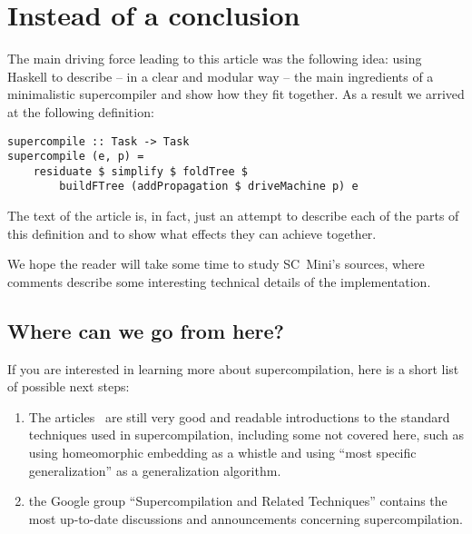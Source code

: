 \section{Instead of a conclusion}

The main driving force leading to this article was the following idea: 
using Haskell to describe -- in a clear and modular way --
the main ingredients of a minimalistic supercompiler and show how they fit together.
As a result we arrived at the following definition:
\begin{lstlisting}
supercompile :: Task -> Task
supercompile (e, p) =
	residuate $ simplify $ foldTree $
		buildFTree (addPropagation $ driveMachine p) e
\end{lstlisting}
The text of the article is, in fact, just an attempt to describe each
of the parts of this definition and to show what effects they can
achieve together.

We hope the reader will take some time to study SC~Mini's sources,
where comments describe some interesting technical details of
the implementation.

\subsection{Where can we go from here?}

If you are interested in learning more about supercompilation, here is a short
list of possible next steps:

\begin{enumerate}
  \item The articles~\cite{Sorensen1998Introduction,Sorensen1996Positive} are 
  still very good and readable introductions to the standard techniques used in supercompilation,
  including some not covered here, such as using homeomorphic embedding as a whistle and
  using ``most specific generalization'' as a generalization algorithm.
  \item the Google group ``Supercompilation and Related Techniques''  contains the most 
  up-to-date discussions and announcements concerning supercompilation.
  \end{enumerate}

